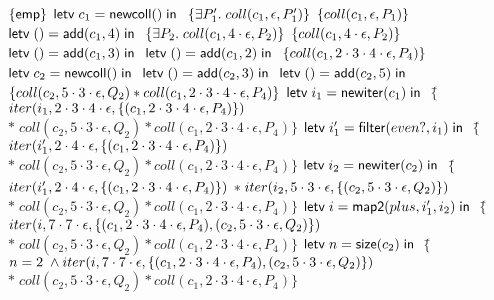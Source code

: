 \begin{specification}
\nextline
 $\{{\mathsf{emp}}\}$  
 $\mathsf{letv}\;c_1 = \mathsf{newcoll}()\;\mathsf{in}\;$  \nextline
 $\{{\exists P'_1.\; coll(c_1, \epsilon, P'_1)}\}$  
 $\{{coll(c_1, \epsilon, P_1)}\}$  
 $\mathsf{letv}\;() = \mathsf{add}(c_1, 4)\;\mathsf{in}\;$  \nextline
 $\{{\exists P_2.\; coll(c_1, 4\cdot\epsilon, P_2)}\}$  
  $\{{coll(c_1, 4\cdot\epsilon, P_2)}\}$  
 $\mathsf{letv}\;() = \mathsf{add}(c_1, 3)\;\mathsf{in}\;$  \nextline
 $\mathsf{letv}\;() = \mathsf{add}(c_1, 2)\;\mathsf{in}\;$  \nextline
 $\{{coll(c_1, 2\cdot3\cdot4\cdot\epsilon, P_4)}\}$  
 $\mathsf{letv}\;c_2 = \mathsf{newcoll}()\;\mathsf{in}\;$  \nextline
 $\mathsf{letv}\;() = \mathsf{add}(c_2, 3)\;\mathsf{in}\;$  
 $\mathsf{letv}\;() = \mathsf{add}(c_2, 5)\;\mathsf{in}\;$  
 $\{{coll(c_2, 5\cdot3\cdot\epsilon, Q_2) * coll(c_1, 2\cdot3\cdot4\cdot\epsilon, P_4)}\}$  
 $\mathsf{letv}\;i_1 = \mathsf{newiter}(c_1)\;\mathsf{in}\;$  
 $\{$\=$iter(i_1, 2\cdot3\cdot4\cdot\epsilon, \{{(c_1, 2\cdot3\cdot4\cdot\epsilon, P_4)}\})$
 \nextline 
 \>$*\; coll(c_2, 5\cdot3\cdot\epsilon, Q_2) * coll(c_1, 2\cdot3\cdot4\cdot\epsilon, P_4)\}$  
 $\mathsf{letv}\;i'_1 = \mathsf{filter}(even?, i_1)\;\mathsf{in}\;$  
 $\{$\=$iter(i'_1, 2\cdot4\cdot\epsilon, \{{(c_1, 2\cdot3\cdot4\cdot\epsilon, P_4)}\})$  \nextline
  \>$*\; coll(c_2, 5\cdot3\cdot\epsilon, Q_2) * coll(c_1, 2\cdot3\cdot4\cdot\epsilon, P_4)\}$ 
 $\mathsf{letv}\;i_2 = \mathsf{newiter}(c_2)\;\mathsf{in}\;$  
 $\{$\=$iter(i'_1, 2\cdot4\cdot\epsilon, \{{(c_1, 2\cdot3\cdot4\cdot\epsilon, P_4)}\})$ \nextline
  \>$*\;iter(i_2, 5\cdot3\cdot\epsilon, \{{(c_2, 5\cdot3\cdot\epsilon, Q_2)}\})$  \nextline
 \>$*\;coll(c_2, 5\cdot3\cdot\epsilon, Q_2) * coll(c_1, 2\cdot3\cdot4\cdot\epsilon, P_4)\}$  
 $\mathsf{letv}\;i = \mathsf{map2}(plus, i'_1, i_2)\;\mathsf{in}\;$  \nextline
 $\{$\=$iter(i, 7\cdot7\cdot\epsilon, \{{(c_1, 2\cdot3\cdot4\cdot\epsilon, P_4), (c_2, 5\cdot3\cdot\epsilon, Q_2)}\})$  \nextline
 \> $*\; coll(c_2, 5\cdot3\cdot\epsilon, Q_2) * coll(c_1, 2\cdot3\cdot4\cdot\epsilon, P_4)\}$  
 $\mathsf{letv}\;n = \mathsf{size}(c_2)\;\mathsf{in}\;$  \nextline
 $\{$\=$n = 2 \;\land
iter(i, 7\cdot7\cdot\epsilon, \{{(c_1, 2\cdot3\cdot4\cdot\epsilon, P_4), (c_2, 5\cdot3\cdot\epsilon, Q_2)}\})$ \nextline
\>$*\;coll(c_2, 5\cdot3\cdot\epsilon, Q_2) * coll(c_1, 2\cdot3\cdot4\cdot\epsilon, P_4)\}$  


\end{specification}
